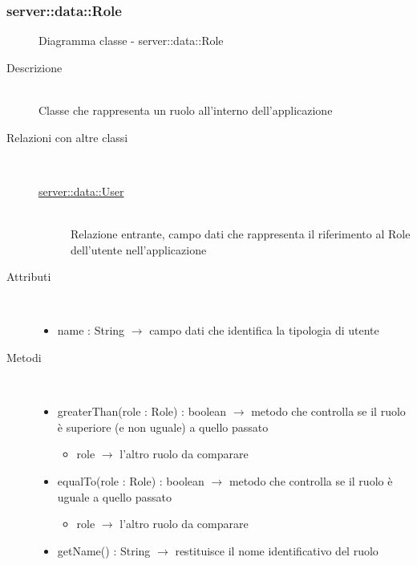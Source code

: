 \subsubsection[Role]{server::data::Role}
\begin{figure}[H]
	\centering
	\caption{Diagramma classe - server::data::Role}
\end{figure}\begin{description}
\item[Descrizione] \hfill \\
Classe che rappresenta un ruolo all'interno dell'applicazione
\item[Relazioni con altre classi] \hfill \\
\vspace{-7mm}
\begin{description}
	\item[\hyperlink{server::data::User}{server::data::User}] \hfill \\
	Relazione entrante, campo dati che rappresenta il riferimento al Role dell'utente nell'applicazione
\end{description}

\item[Attributi] \hfill \\
\vspace{-7mm}
\begin{itemize}
	\item name : String $\rightarrow$ campo dati che identifica la tipologia di utente
\end{itemize}

\item[Metodi] \hfill \\
\vspace{-7mm}
\begin{itemize}
	\item greaterThan(role : Role) : boolean $\rightarrow$ metodo che controlla se il ruolo è superiore (e non uguale) a quello passato\begin{itemize}
		\item role $\rightarrow$ l'altro ruolo da comparare
	\end{itemize}
	
	\item equalTo(role : Role) : boolean $\rightarrow$ metodo che controlla se il ruolo è uguale a quello passato\begin{itemize}
		\item role $\rightarrow$ l'altro ruolo da comparare
	\end{itemize}
	
	\item getName() : String $\rightarrow$ restituisce il nome identificativo del ruolo
\end{itemize}

\end{description}

